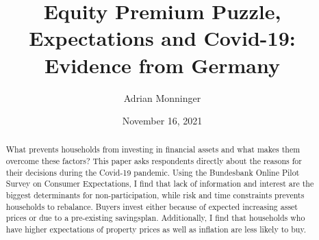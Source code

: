 \documentclass[ProjectABM]{subfiles}
\begin{document}
\providecommand{\versn}{pdf} %
\ifthenelse{\boolean{Web}}{    %
  \renewcommand{\versn}{Web}     %
  \renewcommand{\rootFromOut}{.} %
}{}  %


\title{Equity Premium Puzzle, Expectations and Covid-19:\\ Evidence from Germany}

\author{Adrian Monninger\authNum}




\renewcommand{\forcedate}{November 16, 2021}\date{\forcedate}

\maketitle
\hypertarget{abstract}{}
\begin{abstract}
What prevents households from investing in financial assets and what makes them overcome these factors? This paper asks respondents directly about the reasons for their decisions during the Covid-19 pandemic. Using the Bundesbank Online Pilot Survey on Consumer Expectations, I find that lack of information and interest are the biggest determinants for non-participation, while risk and time constraints prevents households to rebalance. Buyers invest either because of expected increasing asset prices or due to a pre-existing savingsplan. Additionally, I find that households who have higher expectations of property prices as well as inflation are less likely to buy.
\end{abstract}


\hypertarget{links}{}

\begin{authorsinfo}
\end{authorsinfo}
\end{document}
